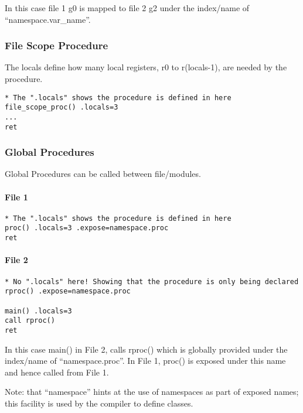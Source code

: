 In this case file 1 g0 is mapped to file 2 g2 under the index/name of
``namespace.var\_name''.

\hypertarget{file-scope-procedure}{%
\subsubsection{File Scope Procedure}\label{file-scope-procedure}}

The locals define how many local registers, r0 to r(locals-1), are
needed by the procedure.

\begin{verbatim}
* The ".locals" shows the procedure is defined in here
file_scope_proc() .locals=3
...
ret
\end{verbatim}

\hypertarget{global-procedures}{%
\subsubsection{Global Procedures}\label{global-procedures}}

Global Procedures can be called between file/modules.

\hypertarget{file-1-1}{%
\paragraph{File 1}\label{file-1-1}}

\begin{verbatim}
* The ".locals" shows the procedure is defined in here
proc() .locals=3 .expose=namespace.proc
ret
\end{verbatim}

\hypertarget{file-2-1}{%
\paragraph{File 2}\label{file-2-1}}

\begin{verbatim}
* No ".locals" here! Showing that the procedure is only being declared 
rproc() .expose=namespace.proc

main() .locals=3 
call rproc()
ret
\end{verbatim}

In this case main() in File 2, calls rproc() which is globally provided
under the index/name of ``namespace.proc''. In File 1, proc() is exposed
under this name and hence called from File 1.

Note: that ``namespace'' hints at the use of namespaces as part of
exposed names; this facility is used by the compiler to define classes.

